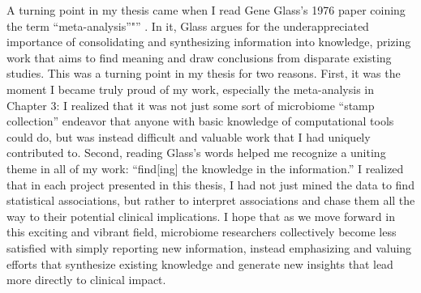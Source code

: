 A turning point in my thesis came when I read Gene Glass's 1976 paper coining the term ``meta-analysis''"'' \cite{glass-1976}.
In it, Glass argues for the underappreciated importance of consolidating and synthesizing information into knowledge, prizing work that aims to find meaning and draw conclusions from disparate existing studies.
This was a turning point in my thesis for two reasons.
First, it was the moment I became truly proud of my work, especially the meta-analysis in Chapter 3: I realized that it was not just some sort of microbiome ``stamp collection'' endeavor that anyone with basic knowledge of computational tools could do, but was instead difficult and valuable work that I had uniquely contributed to.
Second, reading Glass's words helped me recognize a uniting theme in all of my work: ``find[ing] the knowledge in the information.''
I realized that in each project presented in this thesis, I had not just mined the data to find statistical associations, but rather to interpret associations and chase them all the way to their potential clinical implications.
I hope that as we move forward in this exciting and vibrant field, microbiome researchers collectively become less satisfied with simply reporting new information, instead emphasizing and valuing efforts that synthesize existing knowledge and generate new insights that lead more directly to clinical impact.

\begin{singlespace}


\end{singlespace}
